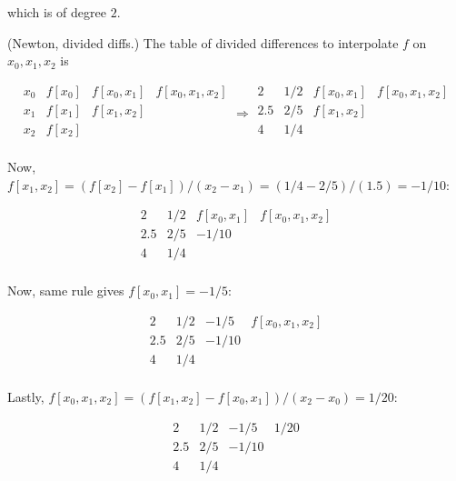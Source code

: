 \documentclass[12pt]{article}
\theoremstyle{definition}
\begin{document}
which is of degree $2$. 

(Newton, divided diffs.) The table of divided differences to interpolate $f$ on
$x_0, x_1, x_2$ is 

\begin{equation*}
    \begin{array}{c|c|c|c}
        x_0 & f[x_0] & f[x_0, x_1] & f[x_0, x_1, x_2] \\
        x_1 & f[x_1] & f[x_1, x_2] \\
        x_2 & f[x_2]  \\
\end{array} \Rightarrow
\begin{array}{c|c|c|c}
        2 & 1 /2 & f[x_0, x_1] & f[x_0, x_1, x_2] \\
        2.5 & 2 / 5 & f[x_1, x_2] \\
        4 & 1 / 4  \\
\end{array}
\end{equation*} 

Now, $f[x_1, x_2] = ( f[x_2] - f[x_1] ) / (x_2 - x_1) = ( 1 / 4 - 2 / 5 ) /
(1.5) = -1 / 10$:

\begin{equation*}
\begin{array}{c|c|c|c}
        2 & 1 /2 & f[x_0, x_1] & f[x_0, x_1, x_2] \\
        2.5 & 2 / 5 & -1 / 10 \\
        4 & 1 / 4  \\
\end{array}
\end{equation*}

Now, same rule gives $f[x_0, x_1] = - 1 / 5$:


\begin{equation*}
\begin{array}{c|c|c|c}
        2 & 1 /2 & - 1/5 & f[x_0, x_1, x_2] \\
        2.5 & 2 / 5 & -1 / 10 \\
        4 & 1 / 4  \\
\end{array}
\end{equation*}

Lastly, $f[x_0, x_1, x_2] = (f[x_1, x_2] - f[x_0, x_1]) / (x_2 - x_0) = 1 / 20$:


\begin{equation*}
\begin{array}{c|c|c|c}
        2 & 1 /2 & - 1/5 & 1 / 20 \\
        2.5 & 2 / 5 & -1 / 10 \\
        4 & 1 / 4  \\
\end{array}
\end{equation*}
\end{document}
